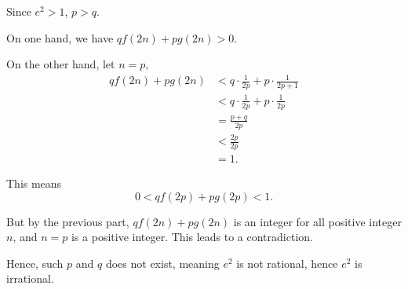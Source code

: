 \begin{enumerate}
          Since \(e^2 > 1\), \(p > q\).

          On one hand, we have \(q f(2n) + p g(2n) > 0\).

          On the other hand, let \(n = p\),
          \begin{align*}
              q f(2n) + p g(2n) & < q \cdot \frac{1}{2p} + p \cdot \frac{1}{2p + 1} \\
                                & < q \cdot \frac{1}{2p} + p \cdot \frac{1}{2p}     \\
                                & = \frac{p + q}{2p}                                \\
                                & < \frac{2p}{2p}                                   \\
                                & = 1.
          \end{align*}

          This means
          \[
              0 < q f(2p) + p g(2p) < 1.
          \]

          But by the previous part, \(q f(2n) + p g(2n)\) is an integer for all positive integer \(n\), and \(n = p\) is a positive integer. This leads to a contradiction.

          Hence, such \(p\) and \(q\) does not exist, meaning \(e^2\) is not rational, hence \(e^2\) is irrational.
\end{enumerate}